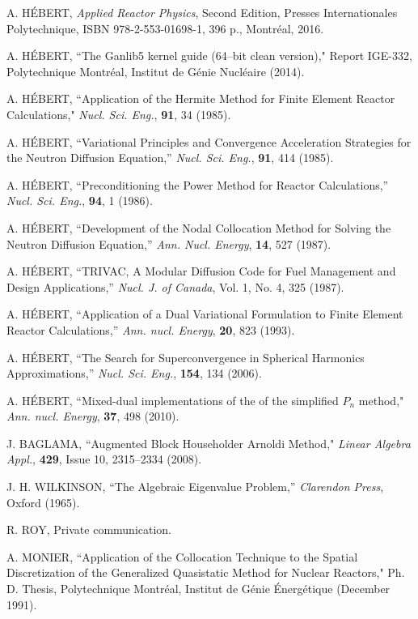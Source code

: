 \begin{thebibliography}{99}

A. H\'EBERT, {\sl Applied Reactor Physics}, Second Edition, Presses Internationales Polytechnique, ISBN 978-2-553-01698-1, 396 p., Montr\'eal, 2016.

A. H\'EBERT, ``The Ganlib5 kernel guide (64--bit clean version)," Report IGE-332, Polytechnique Montr\'eal, Institut de G\'enie Nucl\'eaire (2014).

A. H\'EBERT, ``Application of the Hermite Method for Finite Element Reactor Calculations," {\sl Nucl. Sci. Eng.}, {\bf 91}, 34 (1985).

A. H\'EBERT, ``Variational Principles and Convergence Acceleration Strategies for the Neutron Diffusion Equation,'' {\sl Nucl. Sci. Eng.}, {\bf 91}, 414 (1985).

A. H\'EBERT, ``Preconditioning the Power Method for Reactor Calculations,'' {\sl Nucl. Sci. Eng.}, {\bf 94}, 1 (1986).

A. H\'EBERT, ``Development of the Nodal Collocation Method for Solving the Neutron Diffusion Equation,'' {\sl Ann. Nucl. Energy}, {\bf 14}, 527 (1987).

A. H\'EBERT, ``TRIVAC, A Modular Diffusion Code for Fuel Management and Design Applications,'' {\sl Nucl. J. of Canada}, Vol. 1, No. 4, 325 (1987).

A. H\'EBERT, ``Application of a Dual Variational Formulation to Finite Element Reactor Calculations,'' {\sl Ann. nucl. Energy}, {\bf 20}, 823 (1993).

A. H\'EBERT, ``The Search for Superconvergence in Spherical Harmonics Approximations,'' {\sl Nucl. Sci. Eng.}, {\bf 154}, 134 (2006).

A. H\'EBERT, ``Mixed-dual implementations of the of the simplified $P_n$ method," {\sl Ann. nucl. Energy}, {\bf 37}, 498 (2010).

J. BAGLAMA, ``Augmented Block Householder Arnoldi Method,"
{\sl Linear Algebra Appl.}, {\bf 429}, Issue 10, 2315--2334 (2008).

J. H. WILKINSON, ``The Algebraic Eigenvalue Problem,'' {\sl Clarendon Press}, Oxford (1965).

R. ROY, Private communication.

A. MONIER, ``Application of the Collocation Technique to the Spatial Discretization of the Generalized Quasistatic Method for Nuclear Reactors," Ph. D. Thesis, Polytechnique Montr\'eal, Institut de G\'enie \'Energ\'etique (December 1991).


\end{thebibliography}
